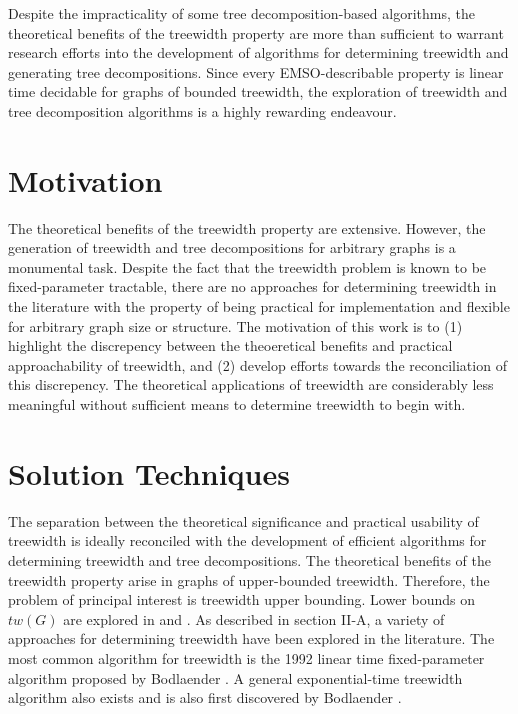 \documentclass[12pt,conference]{IEEEtran}
\theoremstyle{plain}
\begin{document}
Despite the impracticality of some tree decomposition-based algorithms, the theoretical benefits of the treewidth property are more than sufficient to warrant research efforts into the development of algorithms for determining treewidth and generating tree decompositions. Since every EMSO-describable property is linear time decidable for graphs of bounded treewidth, the exploration of treewidth and tree decomposition algorithms is a highly rewarding endeavour.

\section{Motivation}

The theoretical benefits of the treewidth property are extensive. However, the generation of treewidth and tree decompositions for arbitrary graphs is a monumental task. Despite the fact that the treewidth problem is known to be fixed-parameter tractable, there are no approaches for determining treewidth in the literature with the property of being practical for implementation and flexible for arbitrary graph size or structure. The motivation of this work is to (1) highlight the discrepency between the theoeretical benefits and practical approachability of treewidth, and (2) develop efforts towards the reconciliation of this discrepency. The theoretical applications of treewidth are considerably less meaningful without sufficient means to determine treewidth to begin with.

\section{Solution Techniques}

The separation between the theoretical significance and practical usability of treewidth is ideally reconciled with the development of efficient algorithms for determining treewidth and tree decompositions. The theoretical benefits of the treewidth property arise in graphs of upper-bounded treewidth. Therefore, the  problem of principal interest is treewidth upper bounding. Lower bounds on $tw(G)$ are explored in \cite{treewidth-lowerbounds-1} and \cite{treewidth-lowerbounds-2}. As described in section II-A, a variety of approaches for determining treewidth have been explored in the literature. The most common algorithm for treewidth is the 1992 linear time fixed-parameter algorithm proposed by Bodlaender \cite{bodlaender-1992}. A general exponential-time treewidth algorithm also exists and is also first discovered by Bodlaender \cite{bodlaender-2012}.
\end{document}
